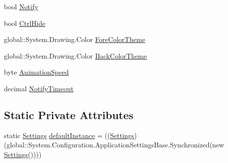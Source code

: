 \begin{DoxyCompactItemize}
\item 
bool \hyperlink{class_sr_p___classroom_inq_1_1_properties_1_1_settings_ad0c83bd5c1a79ad9f1690f5096d48306}{\-Notify}
\item 
bool \hyperlink{class_sr_p___classroom_inq_1_1_properties_1_1_settings_a503512222454f2c3d7bb0dbda6437ac0}{\-Ctrl\-Hide}
\item 
global\-::\-System.\-Drawing.\-Color \hyperlink{class_sr_p___classroom_inq_1_1_properties_1_1_settings_ad3f4ea6ca5ad5d11dc006818a104fb1b}{\-Fore\-Color\-Theme}
\item 
global\-::\-System.\-Drawing.\-Color \hyperlink{class_sr_p___classroom_inq_1_1_properties_1_1_settings_af26cf7b47cfa1a668ce1ebeac8941a18}{\-Back\-Color\-Theme}
\item 
byte \hyperlink{class_sr_p___classroom_inq_1_1_properties_1_1_settings_ac3c244809dca166ec8ee4bf7eb419623}{\-Animation\-Speed}
\item 
decimal \hyperlink{class_sr_p___classroom_inq_1_1_properties_1_1_settings_ab091f12f591ab6ee3a41bc3bbfc441ce}{\-Notify\-Timeout}
\end{DoxyCompactItemize}
\subsection*{\-Static \-Private \-Attributes}
\begin{DoxyCompactItemize}
\item 
static \hyperlink{class_sr_p___classroom_inq_1_1_properties_1_1_settings}{\-Settings} \hyperlink{class_sr_p___classroom_inq_1_1_properties_1_1_settings_a0a71ce7c79440c1532000746426ccf1f}{default\-Instance} = ((\hyperlink{class_sr_p___classroom_inq_1_1_properties_1_1_settings}{\-Settings})(global\-::\-System.\-Configuration.\-Application\-Settings\-Base.\-Synchronized(new \hyperlink{class_sr_p___classroom_inq_1_1_properties_1_1_settings}{\-Settings}())))
\end{DoxyCompactItemize}


